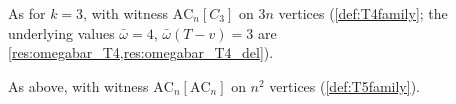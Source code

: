 




\label{res:question_5_9_fails_at_k4}

\begin{decoded}
As for $k = 3$, with witness $\mathrm{AC}_n[C_3]$ on $3n$ vertices
(\cref{def:T4family}; the underlying values $\bar\omega = 4$,
$\bar\omega(T - v) = 3$ are \cref{res:omegabar_T4,res:omegabar_T4_del}).
\end{decoded}






\label{res:question_5_9_fails_at_k5}

\begin{decoded}
As above, with witness $\mathrm{AC}_n[\mathrm{AC}_n]$ on $n^2$
vertices (\cref{def:T5family}).
\end{decoded}



